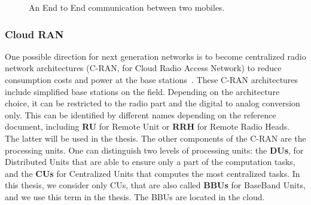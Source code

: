 \begin{figure}
\begin{center}
{
}




 \caption{An End to End communication between two mobiles.}

\label{fig:RAN}
\end{center}
\end{figure}


\subsubsection{Cloud RAN}

One possible direction for next generation networks is to become centralized radio network architectures (C-RAN, for Cloud Radio Access Network) to reduce consumption costs and power at the base stations~\cite{mobile2011c}. These C-RAN architectures include simplified base stations on the field. Depending on the architecture choice, it can be restricted to the radio part and the digital to analog conversion only. This can be identified by different names depending on the reference document, including \textbf{RU} for Remote Unit or \textbf{RRH} for Remote Radio Heads. The latter will be used in the thesis. The other components of the C-RAN  are the processing units. One can distinguish two levels of processing units: the \textbf{DUs}, for Distributed Units that are able to ensure only a part of the computation tasks, and the \textbf{CUs} for Centralized Units that computes the most centralized tasks. In this thesis, we consider only CUs, that are also called \textbf{BBUs} for BaseBand Units, and we use this term in the thesis. The BBUs are located in the cloud. 

